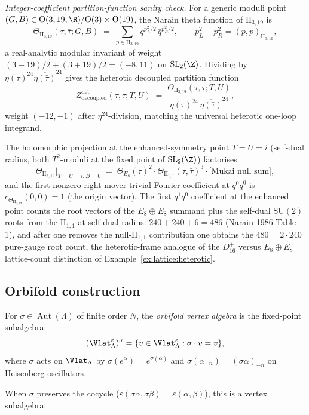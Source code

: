 \begin{example}
\emph{Integer-coefficient partition-function sanity check.} For a
generic moduli point $(G, B) \in \mathrm{O}(3,19;\R)/\mathrm{O}(3)\times
\mathrm{O}(19)$, the Narain theta function of $\mathrm{II}_{3,19}$ is
\[
\Theta_{\mathrm{II}_{3,19}}(\tau, \bar\tau; G, B)
\;=\;
\sum_{p\in\mathrm{II}_{3,19}}
q^{p_L^2/2}\,\bar q^{p_R^2/2},
\qquad
p_L^2 - p_R^2 = (p, p)_{\mathrm{II}_{3,19}},
\]
a real-analytic modular invariant of weight $(3-19)/2 + (3+19)/2 =
(-8, 11)$ on $\mathrm{SL}_2(\Z)$. Dividing by $\eta(\tau)^{24}
\overline{\eta(\bar\tau)}^{24}$ gives the heterotic decoupled
partition function
\begin{equation}\label{eq:lattice:heterotic-decoupled-Z}
Z^{\mathrm{het}}_{\mathrm{decoupled}}(\tau, \bar\tau; T, U)
\;=\;
\frac{\Theta_{\mathrm{II}_{3,19}}(\tau, \bar\tau; T, U)}
 {\eta(\tau)^{24}\,\overline{\eta(\bar\tau)}^{24}},
\end{equation}
weight $(-12, -1)$ after $\eta^{24}$-division, matching the universal
heterotic one-loop integrand.

The holomorphic projection at the enhanced-symmetry point
$T = U = i$ (self-dual radius, both $T^2$-moduli at the fixed point
of $\mathrm{SL}_2(\Z)$) factorises
\[
\Theta_{\mathrm{II}_{3,19}}\Big|_{T=U=i, B=0}
\;=\;
\Theta_{E_8}(\tau)^2\cdot
\Theta_{\mathrm{II}_{1,1}}(\tau, \bar\tau)^3\cdot
\bigl[\text{Mukai null sum}\bigr],
\]
and the first nonzero right-mover-trivial Fourier coefficient at
$q^0\bar q^0$ is $c_{\Theta_{\mathrm{II}_{3,19}}}(0, 0) = 1$ (the
origin vector). The first $q^1\bar q^0$ coefficient at the enhanced
point counts the root vectors of the $E_8\oplus E_8$ summand plus the
self-dual $\mathrm{SU}(2)$ roots from the $\mathrm{II}_{1,1}$ at
self-dual radius: $240 + 240 + 6 = 486$ (Narain 1986 Table 1), and
after one removes the null-$\mathrm{II}_{1,1}$ contribution one
obtains the $480 = 2\cdot 240$ pure-gauge root count, the
heterotic-frame analogue of the $D_{16}^+$ versus $E_8\oplus E_8$
lattice-count distinction of
Example~\ref{ex:lattice:heterotic}.
\end{example}

\subsection{Orbifold construction}

\begin{construction}
\label{constr:lattice:orbifold}
For $\sigma \in \operatorname{Aut}(\Lambda)$ of finite order $N$,
the \emph{orbifold vertex algebra} is the fixed-point subalgebra:
\[
(\Vlat_\Lambda^\varepsilon)^\sigma
= \{v \in \Vlat_\Lambda^\varepsilon : \sigma \cdot v = v\},
\]
where $\sigma$ acts on $\Vlat_\Lambda$ by
$\sigma(e^\alpha) = e^{\sigma(\alpha)}$ and $\sigma(\alpha_{-n}) =
(\sigma\alpha)_{-n}$ on Heisenberg oscillators.

When $\sigma$ preserves the cocycle ($\varepsilon(\sigma\alpha,\sigma\beta)
= \varepsilon(\alpha,\beta)$), this is a vertex subalgebra.
\end{construction}

